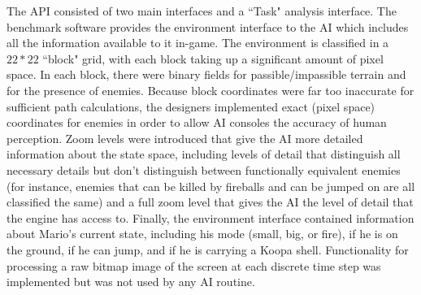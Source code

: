 \documentclass[12pt]{article}
\begin{document}
\begin{multicols*}{2}
The API consisted of two main interfaces and a ``Task" analysis interface. The benchmark software provides the environment interface 
to the AI which includes all the information available to it in-game. The environment is classified in a $22 * 22$ ``block" grid, with each block 
taking up a significant amount of pixel space. In each block, there were binary fields for passible/impassible terrain and for the presence of enemies. 
Because block coordinates were far too inaccurate for sufficient path calculations, the designers implemented exact (pixel space) coordinates for 
enemies in order to allow AI consoles the accuracy of human perception. Zoom levels were introduced that give the AI more detailed information about the 
state space, including levels of detail that distinguish all necessary details but don't distinguish between functionally equivalent enemies (for instance, enemies that 
can be killed by fireballs and can be jumped on are all classified the same) and a full zoom level that gives the AI the level of detail that the engine has access to.
Finally, the environment interface contained information about Mario's current state, including his mode (small, big, or fire), if he is on the ground, if he can jump, 
and if he is carrying a Koopa shell. Functionality for processing a raw bitmap image of the screen at each discrete time step was implemented but was not used by any AI routine.


\end{multicols*}
\end{document}
